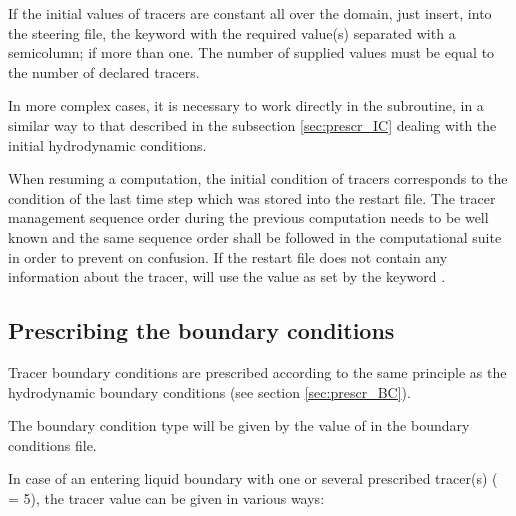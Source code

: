 If the initial values of tracers are constant all over the domain, just insert,
into the steering file, the keyword  with the
required value(s) separated with a semicolumn; if more than one.
The number of supplied values must be equal to the number of declared tracers.

In more complex cases, it is necessary to work directly in the
 subroutine, in a similar way to that described
in the subsection \ref{sec:prescr_IC} 
dealing with the initial hydrodynamic conditions.

When resuming a computation, the initial condition of tracers corresponds to
the condition of the last time step which was stored into the restart file.
The tracer management sequence order during the previous computation needs to
be well known and the same sequence order shall be followed in the
computational suite in order to prevent on confusion.
If the restart file does not contain any information about the tracer,
 will use the value as set by the keyword
.


\subsection{Prescribing the boundary conditions}

Tracer boundary conditions are prescribed according to the same principle
as the hydrodynamic boundary conditions (see section \ref{sec:prescr_BC}).

The boundary condition type will be given by the value of 
in the boundary conditions file.

In case of an entering liquid boundary with one or several prescribed tracer(s)
( = 5), the tracer value can be given in various ways:

